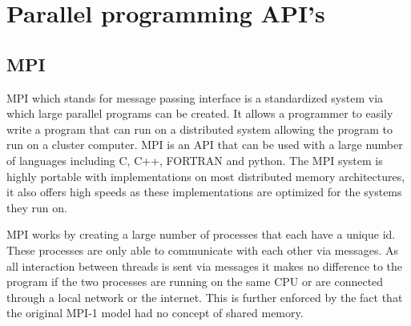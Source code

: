 \section{Parallel programming API's}

\subsection{MPI}
MPI which stands for message passing interface is a standardized system via which large parallel programs can be created. It allows a programmer to easily write a program that can run on a distributed system allowing the program to run on a cluster computer. MPI is an API that can be used with a large number of languages including C, C++, FORTRAN and python. The MPI system is highly portable with implementations on most distributed memory architectures, it also offers high speeds as these implementations are optimized for the systems they run on.

MPI works by creating a large number of processes that each have a unique id. These processes are only able to communicate with each other via messages. As all interaction between threads is sent via messages it makes no difference to the program if the two processes are running on the same CPU or are connected through a local network or the internet. This is further enforced by the fact that the original MPI-1 model had no concept of shared memory.